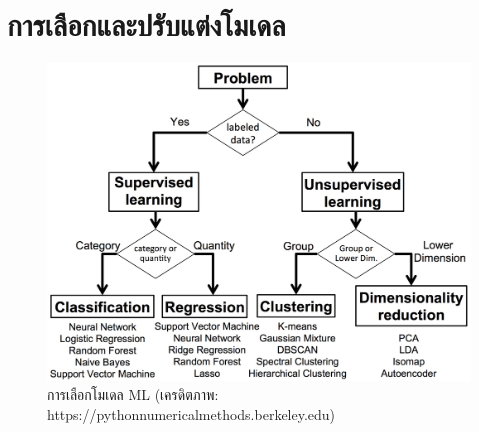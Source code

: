 

\chapter{การเลือกและปรับแต่งโมเดล}
\label{ch:reg_sel_model}

\begin{figure}[H]
    \centering
    \includegraphics[width=0.9\linewidth]{fig/ml-prediction.jpg}
    \caption{การเลือกโมเดล ML (เครดิตภาพ: https://pythonnumericalmethods.berkeley.edu)}
    \label{fig:ml_prediction}
\end{figure}

